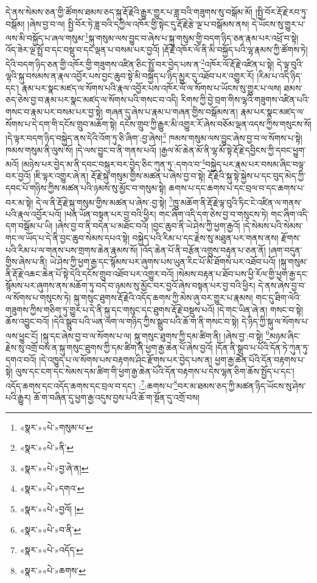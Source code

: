 དེ་ནས་སེམས་ཅན་གྱི་ཚོགས་ཐམས་ཅད་སྐུ་རྡོ་རྗེའི་རྒྱུར་གྱུར་པ་ཟླ་བའི་གཟུགས་སུ་བསྒོམ་མོ། །སྤྱི་བོར་རྡོ་རྗེ་རབ་ཏུ་བསྒོམ། །ཞེས་བྱ་བ་ལ། སྤྱི་བོར་ཏེ་ཟླ་བའི་དཀྱིལ་འཁོར་གྱི་སྟེང་དུ་རྡོ་རྗེ་རྩེ་ལྔ་པ་བསྒོམས་ནས། དེ་ཡོངས་སུ་གྱུར་པ་ལས་མི་བསྐྱོད་པ་ཞལ་གསུམ་\footnote{«སྣར་»«པེ་»གསུམ་པ་}སྐུ་གསུམ་ལས་བྱུང་བ་ཞེས་པ་སྐུ་གསུམ་གྱི་བདག་ཉིད་ཅན་རྣམ་པར་འཕྲོ་བ་སྟེ། འོད་ཟེར་ལྔ་སྤྲོ་བ་དང་བསྡུ་བ་དང་ལྡན་པ་བསམ་པར་བྱའོ། །རྡོ་རྗེ་འཁོར་ལོ་ནི་མི་བསྐྱོད་པའི་ལྷ་རྣམས་ཀྱི་ཚོགས་ཏེ། དེའི་བདག་ཉིད་ཅན་གྱི་འཁོར་གྱི་གཟུགས་འཛིན་ཅིང་སྤྲོ་བར་བྱེད་པས་ན་\footnote{«སྣར་»«པེ་»ནི་}འཁོར་ལོ་རྡོ་རྗེ་འཛིན་པ་སྟེ། དེ་ལྟ་བུའི་ལྷའི་སྐུ་བསམས་ན་རྣལ་འབྱོར་པས་བྱང་ཆུབ་སྟེ་མི་བསྐྱོད་པ་ཉིད་མྱུར་དུ་འཐོབ་པར་འགྱུར་རོ། །རིམ་པ་འདི་ཉིད་དང་། རྣམ་པར་སྣང་མཛད་ལ་སོགས་པའི་རྣལ་འབྱོར་པས་འཁོར་ལོ་ལ་སོགས་པ་ཡོངས་སུ་གྱུར་པ་ལས། ཐམས་ཅད་ཅེས་བྱ་བ་རྣམ་པར་སྣང་མཛད་ལ་སོགས་པའི་གསང་བ་འདི། རིགས་ཀྱི་བྱེ་བྲག་གིས་ལྷའི་གཟུགས་འཛིན་པའི་གསང་བ་རྣམ་པར་བསམ་པར་བྱ་སྟེ། གཞན་དུ་ཞེས་པ་རྣམ་པ་གཞན་གྱིས་བསྒོམས་ན། རྣམ་པར་སྣང་མཛད་ལ་སོགས་པ་དེ་དག་གི་དངོས་གྲུབ་མཆོག་སྟེ། དངོས་གྲུབ་ཀྱི་རྒྱུར་མི་འགྱུར་རོ་ཞེས་བཅོམ་ལྡན་འདས་ཀྱིས་གསུངས་སོ། །དེ་ལྟར་བདག་ཉིད་བསྐྱེད་ནས་དེའི་འོག་ཏུ་ཅི་ཞིག་:བྱ་ཞེས།\footnote{«སྣར་»«པེ་»བྱ་ཞེ་ན།} ཁམས་གསུམ་ལས་བྱུང་ཞེས་བྱ་བ་ལ་སོགས་པ་སྟེ། ཁམས་གསུམ་ནི་ལུས་སོ། །དེ་ལས་བྱུང་བ་ནི་གནས་པའོ། །རྒྱལ་མོ་ཆེན་མོ་ནི་ལྷ་མོ་སྟེ་རྡོ་རྗེ་དབྱིངས་ཀྱི་དབང་ཕྱུག་མའོ། །མཉེས་པར་བྱེད་མ་ནི་དབང་བསྐུར་བར་བྱེད་ཅིང་ཀུན་ཏུ་:དགའ་བ་\footnote{«སྣར་»«པེ་»དགའ་}བསྐྱེད་པར་རྣམ་པར་བསམ་ཞིང་བལྟ་བར་བྱའོ། །ཇི་ལྟར་འགྱུར་ཞེ་ན། རྡོ་རྗེ་སྐུ་གསུམ་གྱིས་མཚན་པ་ཞེས་བྱ་བ་སྟེ། རྡོ་རྗེའི་སྐུ་སྟེ་སྐྱེས་པ་དང་བུད་མེད་ཀྱི་དབང་པོ་གཉིས་ཀྱིས་མཚན་པའི་ཉམས་སུ་མྱོང་བ་གསུམ་སྟེ། ཆགས་པ་དང་ཆགས་པ་དང་བྲལ་བ་དང་ཆགས་པ་བར་མ་སྟེ། དེ་ལ་ནི་རྡོ་རྗེ་སྐུ་གསུམ་གྱིས་མཚན་པ་ཞེས་:བྱ་སྟེ། \footnote{«སྣར་»«པེ་»བྱའོ། ། }ཁྱུ་མཆོག་ནི་རྡོ་རྗེ་ལྟ་བུའི་ཏིང་ངེ་འཛིན་ལ་གནས་པའི་རྣལ་འབྱོར་པའོ། །ཕན་ཡོན་བསྟན་པར་བྱ་བའི་ཕྱིར། གང་ཞིག་འདི་དག་ཅེས་བྱ་བ་གསུངས་ཏེ། གང་ཞིག་འདི་དག་བསྒོམ་པ་ཡི། །ཞེས་བྱ་བ་ནི་བདེན་པ་མཐོང་བའོ། །བྱང་ཆུབ་ནི་ཡེ་ཤེས་ཀྱི་ཕྱག་རྒྱའོ། །དེ་སེམས་པའི་སེམས་གང་ལ་ཡོད་པ་དེ་ནི་བྱང་ཆུབ་སེམས་དཔའ་སྟེ། བསྐྱེད་པའི་རིམ་པ་དང་རྗེས་སུ་མཐུན་པར་གནས་ནས། རྫོགས་པའི་རིམ་པ་ལ་གནས་པས་གྲགས་ཆེན་རྣམས་སོ། །འོད་ཆེན་པོ་ནི་བརྩོན་འགྲུས་བརྟུན་པ་ཅན་ནོ། །ཞག་བདུན་གྱིས་ཞེས་པ་ནི། ཡེ་ཤེས་ཀྱི་ཕྱག་རྒྱ་དང་སྙོམས་པར་ཞུགས་པས་ཡུན་རིང་པོ་མི་ཐོགས་པར་འཐོབ་པའོ། །སྐུ་གསུམ་ནི་རྡོ་རྗེ་འཆང་ཆེན་པོ་སྟེ་དེའི་དངོས་གྲུབ་འཐོབ་པར་འགྱུར་བའོ། །སེམས་བརྟན་པ་ཐོབ་པས་ཕྱི་རོལ་གྱི་ཕྱག་རྒྱ་དང་སྙོམས་པར་ཞུགས་ནས་མཆོག་ཏུ་བདེ་བ་ཉམས་སུ་མྱོང་བར་བྱའོ་ཞེས་བསྟན་པར་བྱ་བའི་ཕྱིར། དེ་ནས་ཞེས་བྱ་བ་ལ་སོགས་པ་གསུངས་ཏེ། སྐུ་གསུང་ཐུགས་རྡོ་རྗེའི་འདོད་ཆགས་ཀྱི་མེས་ཞུ་བར་གྱུར་པ་རྣམས། གང་དུ་ཐིག་ལེའི་གཟུགས་ཀྱིས་གཅིག་ཏུ་གྱུར་པ་དེ་ནི་སྐུ་དང་གསུང་དང་ཐུགས་རྡོ་རྗེ་བསྡུས་པའོ། །དེ་གང་ཡིན་ཞེ་ན། གསང་བ་སྟེ། ཆོས་འབྱུང་བའོ། །དེའི་སྒྲུབ་པའི་ཡན་ལག་ལ་གཉིད་ཀྱིས་སྒྲུབ་པའི་ཆོ་ག་ནི་གསང་བ་སྟེ། དེ་ཉིད་ཀྱི་སྐུ་ལ་སོགས་པ་ལས་ཕྱུང་ངོ། །སྐུ་དང་ཞེས་བྱ་བ་ལ་སོགས་པ་ལ། སྐུ་གསུང་ཐུགས་ཀྱི་དམ་ཚིག་ནི། །ཞེས་བྱ་:བ་སྟེ། \footnote{«སྣར་»«པེ་»བ་ནི་}མཉམ་ཞིང་རྗེས་སུ་འགྲོ་བས་ན་སྐུ་གསུང་ཐུགས་ཀྱི་དམ་ཚིག་ནི་ཕྱག་རྒྱ་ཆེན་པོ་ཞེས་བྱའོ། །དོན་ནི་སྒྲུབ་པ་པོའི་དོན་ཏེ་ཀུན་ཏུ་དགའ་བའོ། །དེ་འཁྱུད་པ་ལ་སོགས་པས་བརྟགས་ཤིང་རྫོགས་པར་བྱེད་པས་ན། ཕྱག་རྒྱ་ཆེན་པོའི་དོན་བརྟགས་པ་སྟེ། ལུས་དང་ངག་དང་སེམས་དམ་ཚིག་གི་ཕྱག་རྒྱ་ཆེན་པོའི་དོན་བརྟགས་པ་དེས་ལྷན་ཅིག་ཆོས་སྤྱོད་པ་དང་། འདོད་ཆགས་དང་འདོད་ཆགས་དང་བྲལ་བ་དང་། :\footnote{«སྣར་»«པེ་»འདོད་}:ཆགས་པ་\footnote{«སྣར་»«པེ་»ཆགས་}བར་མ་ཐམས་ཅད་ཀྱི་མཚན་ཉིད་ཡོངས་སུ་ཤེས་པའི་རྒྱུར། ཆོ་ག་བཞིན་དུ་ཕྱག་རྒྱ་འདུས་བྱས་པའི་ཆོ་ག་སྔོན་དུ་འགྲོ་བས། 